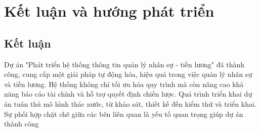 \chapter*{Kết luận và hướng phát triển}
\label{Appendix1}
\section*{Kết luận}
Dự án "Phát triển hệ thống thông tin quản lý nhân sự - tiền lương" đã thành công, cung cấp một giải pháp tự động hóa, hiệu quả trong việc quản lý nhân sự và tiền lương. Hệ thống không chỉ tối ưu hóa quy trình mà còn nâng cao khả năng báo cáo tài chính và hỗ trợ quyết định chiến lược. Quá trình triển khai dự án tuân thủ mô hình thác nước, từ khảo sát, thiết kế đến kiểm thử và triển khai. Sự phối hợp chặt chẽ giữa các bên liên quan là yếu tố quan trọng giúp dự án thành công
